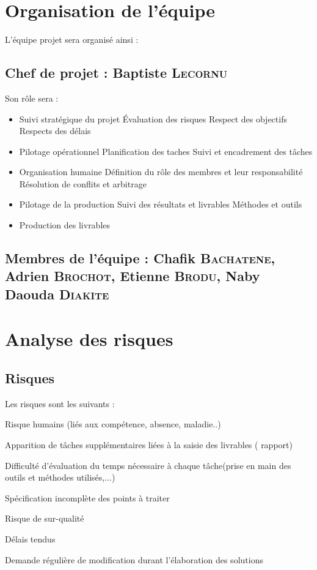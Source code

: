 \section{Organisation de l'équipe}

L’équipe projet sera organisé ainsi :
\subsection{Chef de projet : Baptiste \textsc{Lecornu}}

Son rôle sera :
\begin{itemize}
    \item Suivi stratégique du projet
        \subitem Évaluation des risques
        \subitem Respect des objectifs
        \subitem Respects des délais
    \item Pilotage opérationnel
        \subitem Planification des taches
        \subitem Suivi et encadrement des tâches
    \item Organisation humaine
        \subitem Définition du rôle des membres et leur responsabilité
        \subitem Résolution de conflits et arbitrage
    \item Pilotage de la production
        \subitem Suivi des résultats et livrables
        \subitem Méthodes et outils
    \item Production des livrables
\end{itemize}

\subsection{Membres de l'équipe : Chafik \textsc{Bachatene}, Adrien \textsc{Brochot}, Etienne \textsc{Brodu}, Naby Daouda \textsc{Diakite}}

\section{Analyse des risques}
\subsection{Risques}

\setcounter{risques}{0}

\newcommand{\risque}[1]{
    \addtocounter{risques}{1}
    \item[R\therisques]{\indent#1}
}
Les risques sont les suivants :
\begin{description}
    \risque{Risque humains (liés aux compétence, absence, maladie..)}
    \risque{Apparition de tâches supplémentaires liées à la saisie des livrables ( rapport)}
    \risque{Difficulté d’évaluation du temps nécessaire à chaque tâche(prise en main des outils et méthodes utilisés,...)}
    \risque{Spécification incomplète des points à traiter}
    \risque{Risque de sur-qualité}
    \risque{Délais tendus}
    \risque{Demande régulière de modification durant l’élaboration des solutions}
\end{description}


